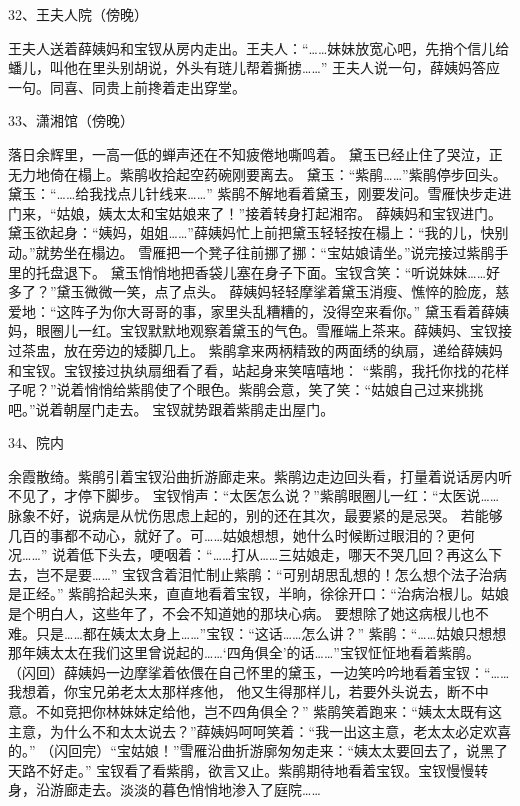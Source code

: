 32、王夫人院（傍晚）\par 
王夫人送着薛姨妈和宝钗从房内走出。王夫人：“……妹妹放宽心吧，先捎个信儿给蟠儿，叫他在里头别胡说，外头有琏儿帮着撕掳……”
王夫人说一句，薛姨妈答应一句。同喜、同贵上前搀着走出穿堂。 

33、潇湘馆（傍晚）\par
落日余辉里，一高一低的蝉声还在不知疲倦地嘶鸣着。
黛玉已经止住了哭泣，正无力地倚在榻上。紫鹃收拾起空药碗刚要离去。 
黛玉：“紫鹃……”紫鹃停步回头。黛玉：“……给我找点儿针线来……” 
紫鹃不解地看着黛玉，刚要发问。雪雁快步走进门来，“姑娘，姨太太和宝姑娘来了！”接着转身打起湘帘。 
薛姨妈和宝钗进门。黛玉欲起身：“姨妈，姐姐……”薛姨妈忙上前把黛玉轻轻按在榻上：“我的儿，快别动。”就势坐在榻边。
雪雁把一个凳子往前挪了挪：“宝姑娘请坐。”说完接过紫鹃手里的托盘退下。
黛玉悄悄地把香袋儿塞在身子下面。宝钗含笑：“听说妹妹……好多了？”黛玉微微一笑，点了点头。 
薛姨妈轻轻摩挲着黛玉消瘦、憔悴的脸庞，慈爱地：“这阵子为你大哥哥的事，家里头乱糟糟的，没得空来看你。”
黛玉看着薛姨妈，眼圈儿一红。宝钗默默地观察着黛玉的气色。雪雁端上茶来。薛姨妈、宝钗接过茶盅，放在旁边的矮脚几上。 
紫鹃拿来两柄精致的两面绣的纨扇，递给薛姨妈和宝钗。宝钗接过执纨扇细看了看，站起身来笑嘻嘻地：
“紫鹃，我托你找的花样子呢？”说着悄悄给紫鹃使了个眼色。紫鹃会意，笑了笑：“姑娘自己过来挑挑吧。”说着朝屋门走去。 
宝钗就势跟着紫鹃走出屋门。 

34、院内\par
余霞散绮。紫鹃引着宝钗沿曲折游廊走来。紫鹃边走边回头看，打量着说话房内听不见了，才停下脚步。 
宝钗悄声：“太医怎么说？”紫鹃眼圈儿一红：“太医说……脉象不好，说病是从忧伤思虑上起的，别的还在其次，最要紧的是忌哭。
若能够几百的事都不动心，就好了。可……姑娘想想，她什么时候断过眼泪的？更何况……”
说着低下头去，哽咽着：“……打从……三姑娘走，哪天不哭几回？再这么下去，岂不是要……” 
宝钗含着泪忙制止紫鹃：“可别胡思乱想的！怎么想个法子治病是正经。” 
紫鹃拾起头来，直直地看着宝钗，半晌，徐徐开口：“治病治根儿。姑娘是个明白人，这些年了，不会不知道她的那块心病。
要想除了她这病根儿也不难。只是……都在姨太太身上……”宝钗：“这话……怎么讲？” 
紫鹃：“……姑娘只想想那年姨太太在我们这里曾说起的……‘四角俱全’的话……”宝钗怔怔地看着紫鹃。 
（闪回）薛姨妈一边摩挲着依偎在自己怀里的黛玉，一边笑吟吟地看着宝钗：“……我想着，你宝兄弟老太太那样疼他，
他又生得那样儿，若要外头说去，断不中意。不如竞把你林妹妹定给他，岂不四角俱全？” 
紫鹃笑着跑来：“姨太太既有这主意，为什么不和太太说去？”薛姨妈呵呵笑着：“我一出这主意，老太太必定欢喜的。” 
（闪回完）“宝姑娘！”雪雁沿曲折游廓匆匆走来：“姨太太要回去了，说黑了天路不好走。” 
宝钗看了看紫鹃，欲言又止。紫鹃期待地看着宝钗。宝钗慢慢转身，沿游廊走去。淡淡的暮色悄悄地渗入了庭院…… 

